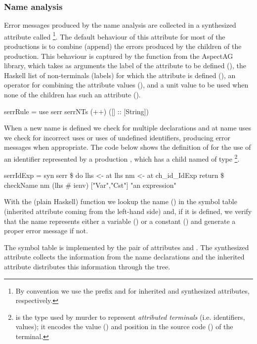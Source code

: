 \subsubsection{Name analysis}
Error messages produced by the name analysis are collected in 
a synthesized attribute called \footnote{By convention we use the prefix  and  for inherited and synthesized attributes, respectively.}.
The default behaviour of this attribute for most of the productions is to combine (append) the errors produced by 
the children of the production.
This behaviour is captured by the  function  from the AspectAG library, 
which takes as arguments the label of the attribute to be defined (), 
the Haskell list of non-terminals (labels) for which the attribute is defined (), 
an operator for combining the attribute values (\texthaskell{++}), 
and a unit value to be used when none of the children has such an attribute ().
\begin{haskell}
serrRule = use serr serrNTs (++) ([] :: [String]) 
\end{haskell}
When a new name is defined we check for multiple declarations and at
name uses we check for incorrect uses or uses of undefined identifiers, producing error messages when appropriate.
The code below shows the definition of  for the use of an identifier
represented by a production
, which has a child named  of type \footnote{ is the type used by murder to represent \emph{attributed terminals} (i.e. identifiers, values); it encodes the value () and position in the source code () of the terminal.}.
\begin{haskell}
serrIdExp = syn serr \$ do 
    lhs <- at lhs
    nm  <- at ch_id_IdExp
    return \$ checkName nm (lhs # ienv) ["Var","Cst"] "an expression"
\end{haskell}
With the (plain Haskell) function  we lookup the name () 
in the symbol table (inherited attribute  coming from the left-hand side)
and, if it is defined, we verify that the name represents either a variable () 
or a constant () and generate  a proper error message if not.

The symbol table is implemented by the pair of attributes  and .
The synthesized attribute  collects the information from the name declarations
and the inherited attribute  distributes this information through the tree.


